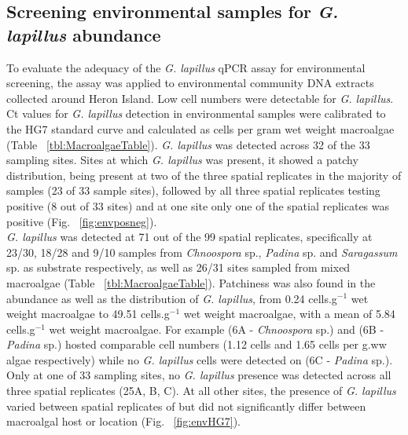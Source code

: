 \documentclass[12pt]{article}
\begin{document}
\subsection*{Screening environmental samples for \emph{G. lapillus} abundance }%
\FloatBarrier
To evaluate the adequacy of the \emph{G. lapillus} %
qPCR assay for environmental screening, the assay was applied to environmental community DNA extracts collected around Heron Island. 
Low cell numbers were detectable for \emph{G. lapillus}. 
Ct values for \emph{G. lapillus} detection in environmental samples were calibrated to the HG7 standard curve and calculated as cells per gram wet weight macroalgae (Table ~\ref{tbl:MacroalgaeTable}).  
\emph{G. lapillus} was detected across 32 of the 33 sampling sites. 
Sites at which \textit{G. lapillus} was present, it showed a patchy distribution, being present at two of the three spatial replicates in the majority of samples (23 of 33 sample sites), followed by all three spatial replicates testing positive (8 out of 33 sites) and at one site only one of the spatial replicates was positive (Fig. ~\ref{fig:envposneg}). \\
\emph{G. lapillus} was detected at 71 out of the 99 spatial replicates, specifically at 23/30, 18/28 and 9/10 samples from \emph{Chnoospora} sp., \emph{Padina} sp. and \emph{Saragassum} sp. as substrate respectively, as well as 26/31 sites sampled from mixed macroalgae (Table ~\ref{tbl:MacroalgaeTable}).
Patchiness was also found in the abundance as well as the distribution of \emph{G. lapillus}, from 0.24 cells.g$^{-1}$ wet weight macroalgae to 49.51 cells.g$^{-1}$ wet weight macroalgae, with a mean of 5.84 cells.g$^{-1}$ wet weight macroalgae. 
For example (6A - \emph{Chnoospora} sp.) and (6B - \emph{Padina} sp.) hosted comparable cell numbers (1.12 cells and 1.65 cells per g.ww algae respectively) while no \emph{G. lapillus} cells were detected on (6C - \emph{Padina} sp.).
Only at one of 33 sampling sites, no \emph{G. lapillus} presence was detected across all three spatial replicates (25A, B, C).
At all other sites, the presence of \textit{G. lapillus} varied between spatial replicates of but did not significantly differ between macroalgal host or location (Fig. ~\ref{fig:envHG7}). 
\end{document}
